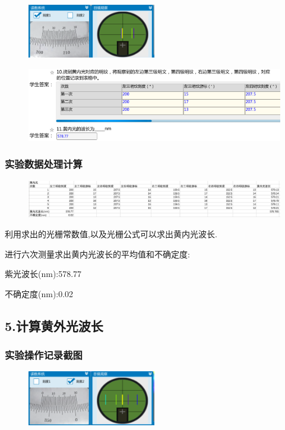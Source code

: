 \documentclass{article}
\begin{document}
            \begin{figure}[H]
                \centering
                \includegraphics[width=0.5\textwidth]{22.png}
                \end{figure}
                \begin{figure}[H]
                    \centering
                    \includegraphics[width=1\textwidth]{33.png}
                    \end{figure}
    
\subsubsection*{实验数据处理计算}
\begin{figure}[H]
    \centering
    \includegraphics[width=1\textwidth]{9.png}
    \end{figure}

    利用求出的光栅常数值,以及光栅公式可以求出黄内光波长.

    进行六次测量求出黄内光波长的平均值和不确定度:
    
    紫光波长(nm):578.77
    
    不确定度(nm):0.02
    

\subsection*{5.计算黄外光波长}
\subsubsection*{实验操作记录截图}
\begin{figure}[H]
    \centering
    \includegraphics[width=0.5\textwidth]{19.png}
    \end{figure}
\end{document}
